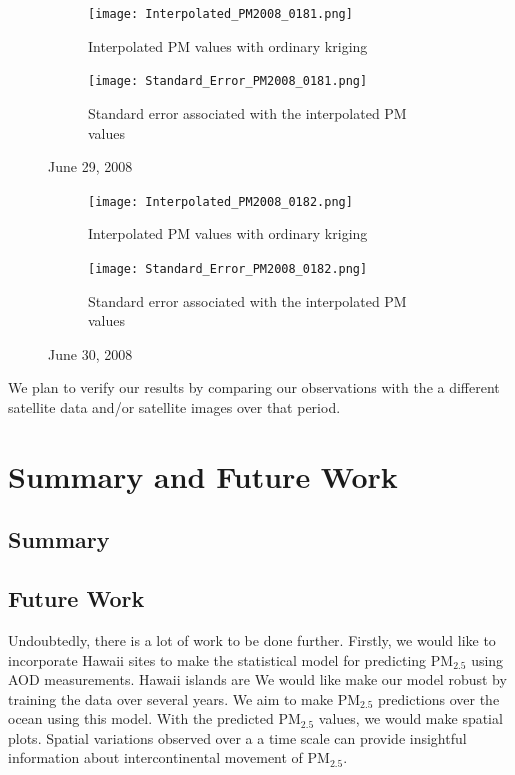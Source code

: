 \documentclass[10pt]{article}
\begin{document}
\begin{figure}[H]
\centering
\begin{subfigure}{.5\textwidth}
  \centering
  \texttt{[image: Interpolated\_PM2008\_0181.png]}
  \caption{Interpolated PM values with ordinary kriging}
\end{subfigure}%
\begin{subfigure}{.5\textwidth}
  \centering
  \texttt{[image: Standard\_Error\_PM2008\_0181.png]}
  \caption{Standard error associated with the interpolated PM values}
\end{subfigure}
\caption{June 29, 2008}
\label{f}
\end{figure}

\begin{figure}[H]
\centering
\begin{subfigure}{.5\textwidth}
  \centering
  \texttt{[image: Interpolated\_PM2008\_0182.png]}
  \caption{ Interpolated PM values with ordinary kriging}
\end{subfigure}%
\begin{subfigure}{.5\textwidth}
  \centering
  \texttt{[image: Standard\_Error\_PM2008\_0182.png]}
  \caption{Standard error associated with the interpolated PM values}
\end{subfigure}
\caption{June 30, 2008}
\label{f}
\end{figure}





We plan to verify our results by comparing our observations with the a different satellite data and/or satellite images over that period.


\section{Summary and Future Work}
\subsection{Summary}

\subsection{Future Work}
Undoubtedly, there is a lot of work to be done further. Firstly, we would like to incorporate Hawaii sites to make the statistical model for predicting PM$_{2.5}$ using AOD measurements. Hawaii islands  are We would like make our model robust by training the data over several years.  We aim to make PM$_{2.5}$ predictions over the ocean using this model. With the predicted PM$_{2.5}$ values, we would make spatial plots. Spatial variations observed over a a time scale can provide insightful information about  intercontinental movement of PM$_{2.5}$. 
\end{document}
